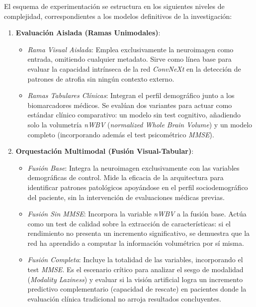 \documentclass[12pt, oneside, english, spanish]{book}
\begin{document}
El esquema de experimentación se estructura en los siguientes niveles de complejidad, correspondientes a los modelos definitivos de la investigación:

\begin{enumerate}
	\item \textbf{Evaluación Aislada (Ramas Unimodales)}:
	\begin{itemize}
		\item \textit{Rama Visual Aislada}: Emplea exclusivamente la neuroimagen como entrada, omitiendo cualquier metadato. Sirve como línea base para evaluar la capacidad intrínseca de la red \textit{ConvNeXt} en la detección de patrones de atrofia sin ningún contexto externo.
		\item \textit{Ramas Tabulares Clínicas}: Integran el perfil demográfico junto a los biomarcadores médicos. Se evalúan dos variantes para actuar como estándar clínico comparativo: un modelo sin test cognitivo, añadiendo solo la volumetría \textit{nWBV} (\textit{normalized Whole Brain Volume}) y un modelo completo (incorporando además el test psicométrico \textit{MMSE}).
	\end{itemize}
	
	\item \textbf{Orquestación Multimodal (Fusión Visual-Tabular)}:
	\begin{itemize}
		\item \textit{Fusión Base}: Integra la neuroimagen exclusivamente con las variables demográficas de control. Mide la eficacia de la arquitectura para identificar patrones patológicos apoyándose en el perfil sociodemográfico del paciente, sin la intervención de evaluaciones médicas previas.
		\item \textit{Fusión Sin MMSE}: Incorpora la variable \textit{nWBV} a la fusión base. Actúa como un test de calidad sobre la extracción de características: si el rendimiento no presenta un incremento significativo, se demuestra que la red ha aprendido a computar la información volumétrica por sí misma.
		\item \textit{Fusión Completa}: Incluye la totalidad de las variables, incorporando el test \textit{MMSE}. Es el escenario crítico para analizar el sesgo de modalidad (\textit{Modality Laziness}) y evaluar si la visión artificial logra un incremento predictivo complementario (capacidad de rescate) en pacientes donde la evaluación clínica tradicional no arroja resultados concluyentes.
	\end{itemize}
\end{enumerate}
\end{document}
